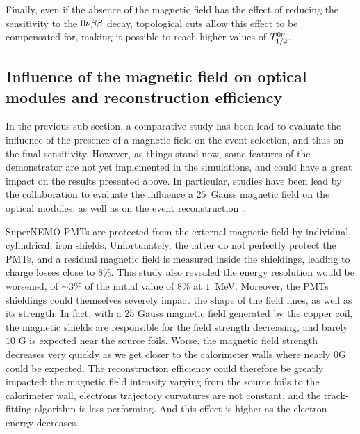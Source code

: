 Finally, even if the absence of the magnetic field has the effect of reducing the sensitivity to the $0\nu\beta\beta$ decay, topological cuts allow this effect to be compensated for, making it possible to reach higher values of $T_{1/2}^{0\nu}$.



\subsection{Influence of the magnetic field on optical modules and reconstruction efficiency}

In the previous sub-section, a comparative study has been lead to evaluate the influence of the presence of a magnetic field on the event selection, and thus on the final sensitivity.
However, as things stand now, some features of the demonstrator are not yet implemented in the simulations, and could have a great impact on the results presented above.
In particular, studies have been lead by the collaboration to evaluate the influence a $25$~Gauss magnetic field on the optical modules,  as well as on the event reconstruction~\cite{CalvezThesis}\cite{internal:magnetic_field}.

SuperNEMO PMTs are protected from the external magnetic field by individual, cylindrical, iron shields.
Unfortunately, the latter do not perfectly protect the PMTs, and a residual magnetic field is measured inside the shieldings, leading to charge losses close to $8\%$.
This study also revealed the energy resolution would be worsened, of $\sim 3\%$ of the initial value of $8\%$ at $1$~MeV.
Moreover, the PMTs shieldings could themselves severely impact the shape of the field lines, as well as its strength.
In fact, with a $25$ Gauss magnetic field generated by the copper coil, the magnetic shields are responsible for the field strength decreasing, and barely $10$ G is expected near the source foils.
Worse, the magnetic field strength decreases very quickly as we get closer to the calorimeter walls where nearly 0G could be expected.
The reconstruction efficiency could therefore be greatly impacted:
the magnetic field intensity varying from the source foils to the calorimeter wall, electrons trajectory curvatures are not constant, and the track-fitting algorithm is less performing.
And this effect is higher as the electron energy decreases.

